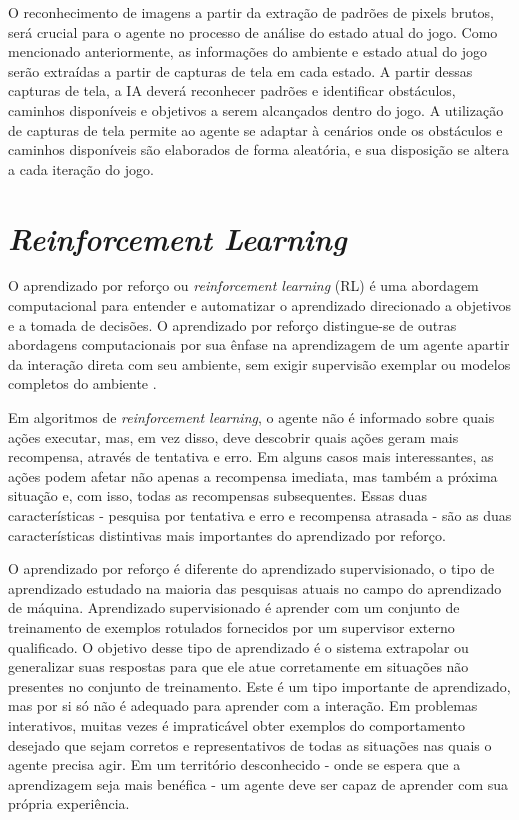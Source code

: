  O reconhecimento de imagens a partir da extração de padrões de pixels brutos, será crucial para o agente no processo de análise do estado atual do jogo. Como mencionado anteriormente, as informações do ambiente e estado atual do jogo serão extraídas a partir de capturas de tela em cada estado. A partir dessas capturas de tela, a IA deverá reconhecer padrões e identificar obstáculos, caminhos disponíveis e objetivos a serem alcançados dentro do jogo. A utilização de capturas de tela permite ao agente se adaptar à cenários onde os obstáculos e caminhos disponíveis são elaborados de forma aleatória, e sua disposição se altera a cada iteração do jogo.

 \section{\textit{Reinforcement Learning}} %
 \label{sec:reinforcement_learning}

 O aprendizado por reforço ou \textit{reinforcement learning} (RL) é uma abordagem computacional para entender e automatizar o aprendizado direcionado a objetivos e a tomada de decisões. O aprendizado por reforço distingue-se de outras abordagens computacionais por sua ênfase na aprendizagem de um agente apartir da interação direta com seu ambiente, sem exigir supervisão exemplar ou modelos completos do ambiente \cite{reinforcement-learning-intro-2018}.

 Em algoritmos de \textit{reinforcement learning}, o agente não é informado sobre quais ações executar, mas, em vez disso, deve descobrir quais ações geram mais recompensa, através de tentativa e erro. Em alguns casos mais interessantes, as ações podem afetar não apenas a recompensa imediata, mas também a próxima situação e, com isso, todas as recompensas subsequentes. Essas duas características - pesquisa por tentativa e erro e recompensa atrasada - são as duas características distintivas mais importantes do aprendizado por reforço.

 O aprendizado por reforço é diferente do aprendizado supervisionado, o tipo de aprendizado estudado na maioria das pesquisas atuais no campo do aprendizado de máquina. Aprendizado supervisionado é aprender com um conjunto de treinamento de exemplos rotulados fornecidos por um supervisor externo qualificado. O objetivo desse tipo de aprendizado é o sistema extrapolar ou generalizar suas respostas para que ele atue corretamente em situações não presentes no conjunto de treinamento. Este é um tipo importante de aprendizado, mas por si só não é adequado para aprender com a interação. Em problemas interativos, muitas vezes é impraticável obter exemplos do comportamento desejado que sejam corretos e representativos de todas as situações nas quais o agente precisa agir. Em um território desconhecido - onde se espera que a aprendizagem seja mais benéfica - um agente deve ser capaz de aprender com sua própria experiência.

